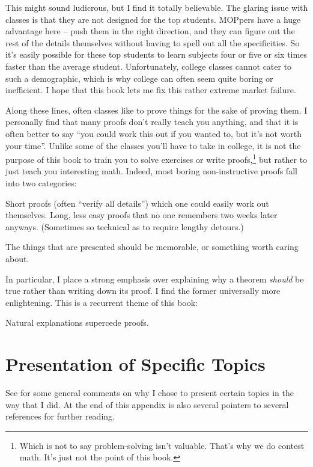 This might sound ludicrous, but I find it totally believable.
The glaring issue with classes is that they are not designed for the top students.
MOPpers have a huge advantage here -- push them in the right direction,
and they can figure out the rest of the details themselves
without having to spell out all the specificities.
So it's easily possible for these top students to learn subjects
four or five or six times faster than the average student.
Unfortunately, college classes cannot cater to such a demographic,
which is why college can often seem quite boring or inefficient.
I hope that this book lets me fix this rather extreme market failure.

Along these lines, often classes like to prove things for the sake of proving them.
I personally find that many proofs don't really teach you anything,
and that it is often better to say ``you could work this out if you wanted to, but it's not worth your time''.
Unlike some of the classes you'll have to take in college,
it is not the purpose of this book to train you to solve exercises or write proofs,\footnote{%
	Which is not to say problem-solving isn't valuable.
	That's why we do contest math.
	It's just not the point of this book.}
but rather to just teach you interesting math.
Indeed, most boring non-instructive proofs fall into two categories:
\begin{enumerate}[(i)]
	\ii Short proofs (often ``verify all details'') which one could easily work out themselves.
	\ii Long, less easy proofs that no one remembers two weeks later anyways.
	(Sometimes so technical as to require lengthy detours.)
\end{enumerate}
The things that are presented should be memorable, or something worth caring about.

In particular, I place a strong emphasis over explaining why a theorem \emph{should}
be true rather than writing down its proof.
I find the former universally more enlightening.
This is a recurrent theme of this book:
\begin{moral}
Natural explanations supercede proofs.
\end{moral}

\section*{Presentation of Specific Topics}
See  for some general comments on why I chose
to present certain topics in the way that I did.
At the end of this appendix is also several pointers to
several references for further reading.


